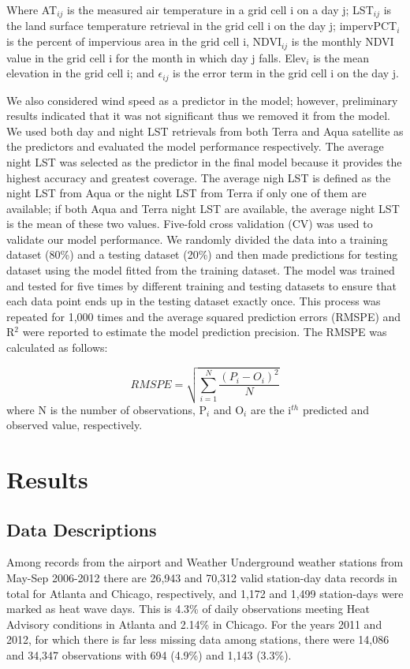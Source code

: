 \documentclass{ametsoc}
\begin{document}
Where AT$_{ij}$ is the measured air temperature in a grid cell i on a day j; LST$_{ij}$ is the land surface temperature retrieval in the grid cell i on the day j; impervPCT$_i$ is the percent of impervious area in the grid cell i, NDVI$_{ij}$ is the monthly NDVI value in the grid cell i for the month in which day j falls. Elev$_{i}$ is the mean elevation in the grid cell i; and $\epsilon$$_{ij}$ is the error term in the grid cell i on the day j.

We also considered wind speed as a predictor in the model; however, preliminary results indicated that it was not significant thus we removed it from the model. We used both day and night LST retrievals from both Terra and Aqua satellite as the predictors and evaluated the model performance respectively. The average night LST was selected as the predictor in the final model because it provides the highest accuracy and greatest coverage. The average nigh LST is defined as the night LST from Aqua or the night LST from Terra if only one of them are available; if both Aqua and Terra night LST are available, the average night LST is the mean of these two values. Five-fold cross validation (CV) was used to validate our model performance. We randomly divided the data into a training dataset (80\%) and a testing dataset (20\%) and then made predictions for testing dataset using the model fitted from the training dataset. The model was trained and tested for five times by different training and testing datasets to ensure that each data point ends up in the testing dataset exactly once. This process was repeated for 1,000 times and the average squared prediction errors (RMSPE) and R$^2$ were reported to estimate the model prediction precision. The RMSPE was calculated as follows:

\begin{equation}
RMSPE =  \sqrt{\sum_{i=1}^{N} \frac{(P_i - O_i)^2}{N}}
\label{eq:error}
\end{equation}
where N is the number of observations, P$_{i}$ and O$_{i}$ are the i$^{th}$ predicted and observed value, respectively. 



\section{Results}\label{section:results}
\subsection{Data Descriptions}\label{subsec:descriptions}
Among records from the airport and Weather Underground weather stations from May-Sep 2006-2012 there are 26,943 and 70,312 valid station-day data records in total for Atlanta and Chicago, respectively, and 1,172 and 1,499 station-days were marked as heat wave days. This is 4.3\% of daily observations meeting Heat Advisory conditions in Atlanta and 2.14\% in Chicago. For the years 2011 and 2012, for which there is far less missing data among stations, there were 14,086 and 34,347 observations with 694 (4.9\%) and 1,143 (3.3\%). 
\end{document}
